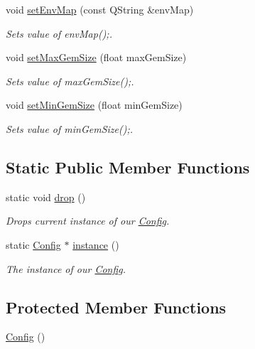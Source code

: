 \begin{DoxyCompactItemize}
void \hyperlink{class_config_a5fd3388c946f7ce1ee6342d6c6b15950}{set\+Env\+Map} (const Q\+String \&env\+Map)
\begin{DoxyCompactList}\small\item\em Sets value of env\+Map();. \end{DoxyCompactList}\item 
void \hyperlink{class_config_a4b35695819904d22fc6e01ee3950a4b2}{set\+Max\+Gem\+Size} (float max\+Gem\+Size)
\begin{DoxyCompactList}\small\item\em Sets value of max\+Gem\+Size();. \end{DoxyCompactList}\item 
void \hyperlink{class_config_a7fa7e53435ece969074029efd14e70e2}{set\+Min\+Gem\+Size} (float min\+Gem\+Size)
\begin{DoxyCompactList}\small\item\em Sets value of min\+Gem\+Size();. \end{DoxyCompactList}\end{DoxyCompactItemize}
\subsection*{Static Public Member Functions}
\begin{DoxyCompactItemize}
\item 
static void \hyperlink{class_config_af99cd0f14331b3df3ed82902728c002c}{drop} ()
\begin{DoxyCompactList}\small\item\em Drops current instance of our \hyperlink{class_config}{Config}. \end{DoxyCompactList}\item 
static \hyperlink{class_config}{Config} $\ast$ \hyperlink{class_config_abf1d4539011ef83cac0fef2ac864a3a9}{instance} ()
\begin{DoxyCompactList}\small\item\em The instance of our \hyperlink{class_config}{Config}. \end{DoxyCompactList}\end{DoxyCompactItemize}
\subsection*{Protected Member Functions}
\begin{DoxyCompactItemize}
\item 
\hyperlink{class_config_abd0c571c116924871e30444b192b792a}{Config} ()
\end{DoxyCompactItemize}
